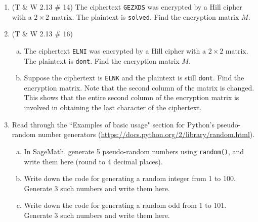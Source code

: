 \documentclass[12pt]{amsart}
\theoremstyle{plain}
\theoremstyle{definition}
\begin{document}
\begin{enumerate}[1.]
\item (T \& W 2.13 \# 14) The ciphertext \texttt{GEZXDS} was encrypted by a Hill cipher with a $2 \times 2$ matrix.  The plaintext is \texttt{solved}.  Find the encryption matrix $M$.
	\begin{framed}
	\vspace{4.7in}
	\end{framed}
		\item (T \& W 2.13 \# 16)
		\begin{enumerate}[a.]
		\item The ciphertext \texttt{ELNI} was encrypted by a Hill cipher with a $2 \times 2$ matrix.  The plaintext is \texttt{dont}.  Find the encryption matrix $M$.
		\begin{framed}
		\vspace{3.4in}
		\end{framed}
		\item Suppose the ciphertext is \texttt{ELNK} and the plaintext is still \texttt{dont}.  Find the encryption matrix.  Note that the second column of the matrix is changed.  This shows that the entire second column of the encryption matrix is involved in obtaining the last character of the ciphertext.
		\begin{framed}
		\vspace{3.4in}
		\end{framed}
		\end{enumerate}
	\item Read through the ``Examples of basic usage" section for Python's pseudo-random number generators (\url{https://docs.python.org/2/library/random.html}).
	\begin{enumerate}[a.]
		\item In SageMath, generate 5 pseudo-random numbers using \texttt{random()}, and write them here (round to 4 decimal places).
			\begin{framed}
			\vspace{.5in}
			\end{framed}
		\item Write down the code for generating a random integer from 1 to 100.  Generate 3 such numbers and write them here.
			\begin{framed}
			\vspace{.5in}
			\end{framed}
		 \item Write down the code for generating a random odd from 1 to 101.  Generate 3 such numbers and write them here.

\end{enumerate}
\end{enumerate}
\end{document}
